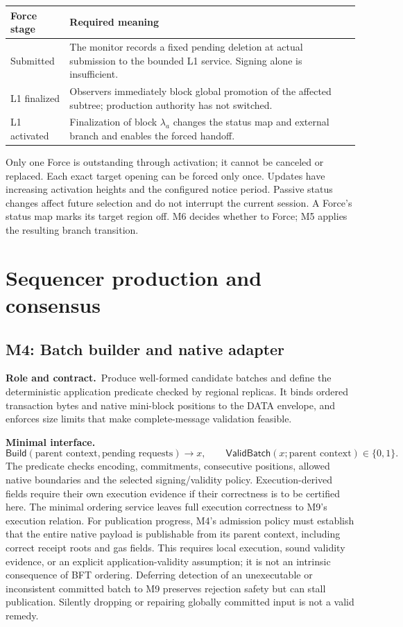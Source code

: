 \documentclass[11pt,a4paper]{article}
\newcommand{\api}[1]{\ensuremath{\mathsf{#1}}}
\newcommand{\role}{\textbf{Role and contract.}\ }
\newcommand{\iface}{\textbf{Minimal interface.}\ }
\begin{document}
\begin{center}\small
\begin{tabularx}{\linewidth}{@{}p{.19\linewidth}Y@{}}
\toprule Force stage & Required meaning\\\midrule
Submitted & The monitor records a fixed pending deletion at actual
submission to the bounded L1 service. Signing alone is insufficient.\\
L1 finalized & Observers immediately block global promotion of the
affected subtree; production authority has not switched.\\
L1 activated & Finalization of block $\lambda_a$ changes the status map
and external branch and enables the forced handoff.\\\bottomrule
\end{tabularx}
\end{center}
Only one Force is outstanding through activation; it cannot be canceled
or replaced. Each exact target opening can be forced only once. Updates
have increasing activation heights and the configured notice period.
Passive status changes affect future selection and do not interrupt the
current session. A Force's status map marks its target region off.
M6 decides whether to Force; M5 applies the resulting
branch transition.

\section{Sequencer production and consensus}\label{sec:sequencer}
\subsection{M4: Batch builder and native adapter}\label{sec:builder}
\role Produce well-formed candidate batches and define the deterministic
application predicate checked by regional replicas. It binds ordered
transaction bytes and native mini-block positions to the DATA envelope,
and enforces size limits that make complete-message validation feasible.

\iface
\[
 \api{Build}(\text{parent context},\text{pending requests})\to x,
 \qquad \api{ValidBatch}(x;\text{parent context})\in\{0,1\}.
\]
The predicate checks encoding, commitments, consecutive positions,
allowed native boundaries and the selected signing/validity policy.
Execution-derived fields require their own execution evidence if their
correctness is to be certified here. The minimal ordering service leaves
full execution correctness to M9's execution relation.
For publication progress, M4's admission policy must establish that the
entire native payload is publishable from its parent context, including
correct receipt roots and gas fields. This requires local execution,
sound validity evidence, or an explicit application-validity assumption;
it is not an intrinsic consequence of BFT ordering. Deferring detection
of an unexecutable or inconsistent committed batch to M9 preserves
rejection safety but can stall publication. Silently dropping or repairing
globally committed input is not a valid remedy.
\end{document}
